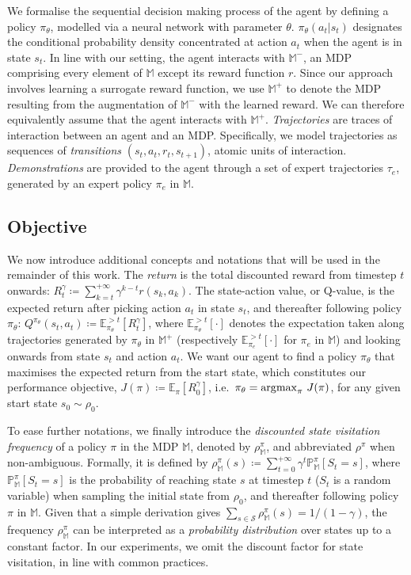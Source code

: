 We formalise the sequential decision making process of the agent by defining a
policy $\pi_\theta$, modelled via a neural network with parameter
$\theta$.
$\pi_\theta(a_t|s_t)$ designates the conditional probability density
concentrated at action $a_t$ when the agent is in state $s_t$.
In line with our setting, the agent interacts with $\mathbb{M}^-$,
an MDP comprising every element of $\mathbb{M}$ except its reward function $r$.
Since our approach involves learning a surrogate reward function, we use
$\mathbb{M}^+$ to denote the MDP resulting from the augmentation of
$\mathbb{M}^-$ with the learned reward.
We can therefore equivalently assume that the agent interacts with
$\mathbb{M}^+$.
\textit{Trajectories} are traces of interaction between an agent and an MDP.
Specifically, we model trajectories as sequences of \textit{transitions}
$(s_t, a_t, r_t, s_{t+1})$, atomic units of interaction.
\textit{Demonstrations} are provided to the agent through a set of expert
trajectories $\tau_e$, generated by an expert policy $\pi_e$ in $\mathbb{M}$.

\subsection*{Objective}

We now introduce
additional concepts and notations that will be used in the
remainder of this work.
The \textit{return} is the total discounted reward from timestep $t$ onwards:
$R_t^\gamma \coloneqq \sum_{k=t}^{+\infty} \gamma^{k-t} r(s_k, a_k)$.
The state-action value, or Q-value, is the expected return after
picking action $a_t$ in state $s_t$, and thereafter following policy
$\pi_\theta$:
$Q^{\pi_\theta}(s_t, a_t) \coloneqq
\mathbb{E}_{\pi_\theta}^{>t}[R_t^\gamma]$,
where $\mathbb{E}_{\pi_\theta}^{>t}[\cdot]$ denotes the expectation taken along
trajectories generated by $\pi_\theta$ in $\mathbb{M}^+$ (respectively
$\mathbb{E}_{\pi_e}^{>t}[\cdot]$ for $\pi_e$ in $\mathbb{M}$) and looking
onwards from state $s_t$ and action $a_t$.
We want our agent to find a policy $\pi_\theta$ that maximises the expected
return from the start state, which constitutes our performance objective,
$J(\pi) \coloneqq \mathbb{E}_\pi[R_0^\gamma]$,
i.e.~$\pi_\theta = \operatorname*{\arg\!\max}_\pi \, J(\pi)$,
for any given start state $s_0 \sim \rho_0$.

To ease further notations, we finally introduce the
\textit{discounted state visitation frequency}
of a policy $\pi$ in the MDP $\mathbb{M}$,
denoted by $\rho^\pi_\mathbb{M}$, and abbreviated $\rho^\pi$ when non-ambiguous.
Formally, it is defined by
$\rho^\pi_\mathbb{M} (s)
\coloneqq
\sum_{t=0}^{+\infty} \gamma^t \mathbb{P}^\pi_\mathbb{M} [S_t=s]$,
where $\mathbb{P}^\pi_\mathbb{M} [S_t=s]$ is the probability of reaching state $s$
at timestep $t$ ($S_t$ is a random variable)
when sampling the initial state from $\rho_0$, and thereafter following policy $\pi$ in $\mathbb{M}$.
Given that a simple derivation gives $\sum_{s \in \mathcal{S}} \rho^\pi_\mathbb{M}(s) = 1 / (1-\gamma)$,
the frequency
$\rho^\pi_\mathbb{M}$ can be interpreted as a \textit{probability distribution} over states up to a constant factor.
In our experiments, we omit the discount factor  for state visitation, in line
with common practices.



